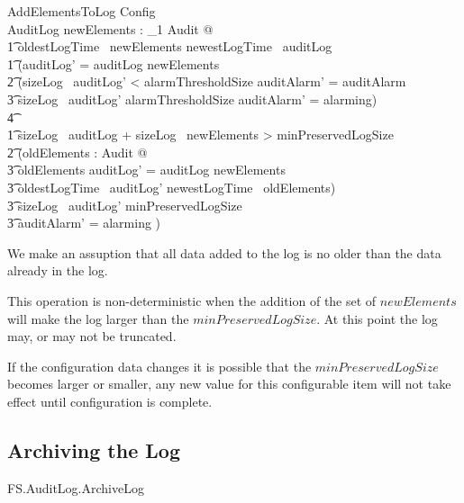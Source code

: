 \begin{lateschema}{AddElementsToLog}
        Config
\\      \Delta AuditLog
\where
        \exists newElements : \finset_1 Audit @
\\ \t1        oldestLogTime~ newElements \geq newestLogTime~ auditLog
\also
\\ \t1 \land  (auditLog' = auditLog \cup newElements
\\ \t2  \land (sizeLog~ auditLog' < alarmThresholdSize \land
auditAlarm' = auditAlarm   
\\ \t3  \lor  sizeLog~ auditLog' \geq alarmThresholdSize \land
auditAlarm' = alarming)
\\ \t4  \lor
\\ \t1    sizeLog~ auditLog + sizeLog~ newElements > minPreservedLogSize 
\\ \t2  \land (\exists oldElements : \finset Audit  @ 
\\ \t3  oldElements \cup auditLog' = auditLog \cup newElements 
\\ \t3  \land oldestLogTime~ auditLog' \geq newestLogTime~ oldElements)
\\ \t3  \land sizeLog~ auditLog' \geq minPreservedLogSize
\\ \t3  \land auditAlarm' = alarming  )            
\end{lateschema}
\begin{Zcomment}
\item
We make an assuption that all data added to the log is no older than
the data already in the log. 
\item
This operation is non-deterministic when the addition of the set of
$newElements$ will make the log larger than the
$minPreservedLogSize$. At this point the log may, or may not be
truncated.
\item
If the configuration data changes it is possible that the $minPreservedLogSize$
becomes larger or smaller, any new value for this configurable item
will not take effect until configuration is complete.
\end{Zcomment}

\subsection{Archiving the Log}

\begin{traceunit}{FS.AuditLog.ArchiveLog}
\end{traceunit}

